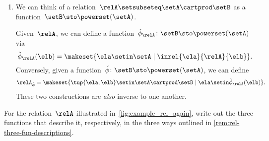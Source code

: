 \begin{enumerate}
    \item We can think of a relation~$\relA \setsubseteq \setA \cartprod \setB$ as a function~$\setB  \sto \powerset (\setA)$.

          Given~$\relA$, we can define a function~$\check \phi_{\relA} \colon \setB \sto \powerset (\setA)$ via
          \begin{equation}
              \check \phi_{\relA} (\elb) = \makeset{ \ela \setin \setA \mid \inrel{\ela}{\relA}{\elb}}.
          \end{equation}
          Conversely, given a function~$\check \phi \colon \setB \sto \powerset (\setA)$, we can define
          \begin{equation}
              \relA_{\check \phi} = \makeset{ \tup{\ela, \elb} \setin \setA \cartprod \setB \mid \ela \setin \check \phi_{\relA}(\elb)}.
          \end{equation}
          These two constructions are \emph{also} inverse to one another.
\end{enumerate}

\begin{marginfigure}
    \centering
    \caption{}
    \label{fig:example_rel_again}
\end{marginfigure}
\vfill
\begin{gradedexercise}
    \label{ex:Rel3Functions}
    For the relation~$\relA$ illustrated in~\cref{fig:example_rel_again}, write out the three functions that describe it, respectively, in the three ways outlined in \cref{rem:rel-three-fun-descriptions}.
\end{gradedexercise}

